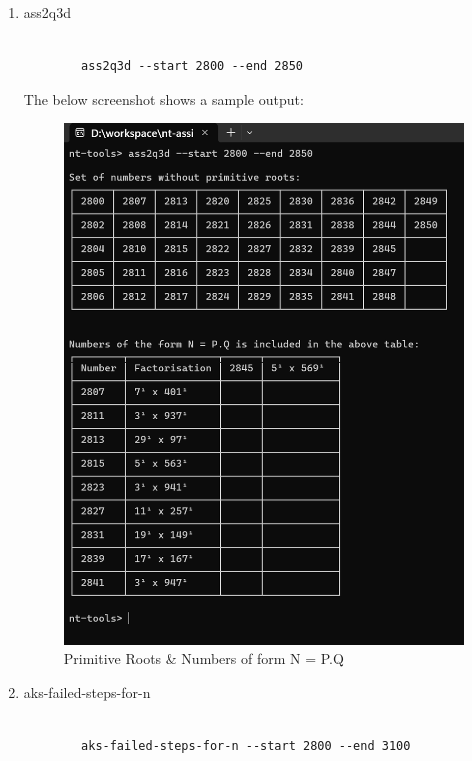 \documentclass{article}
\begin{document}
\begin{enumerate}
        \item ass2q3d
        \begin{lstlisting}[style=DOS]

        ass2q3d --start 2800 --end 2850
        \end{lstlisting}

        The below screenshot shows a sample output:
        \begin{figure}[H]
            \centering
            \includegraphics[scale=0.4]{ass2q3d.png}
            \caption{Primitive Roots \& Numbers of form N = P.Q}
        \end{figure}

        \item aks-failed-steps-for-n
        \begin{lstlisting}[style=DOS]

        aks-failed-steps-for-n --start 2800 --end 3100
        \end{lstlisting}


\end{enumerate}
\end{document}
